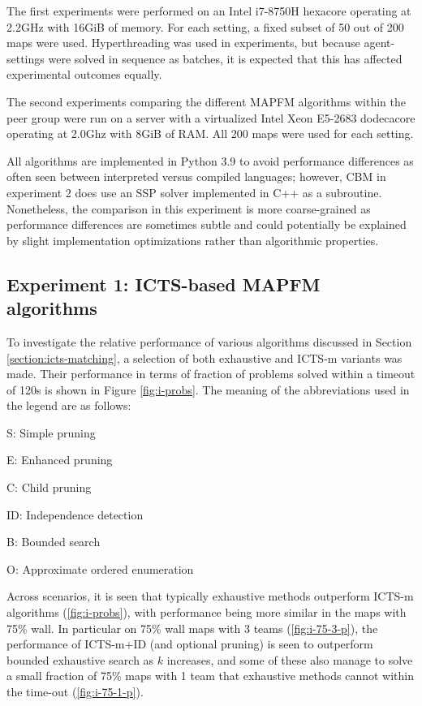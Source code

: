 \documentclass[english,10pt]{article}
\begin{document}
	The first experiments were performed on an Intel i7-8750H hexacore operating at 2.2GHz with 16GiB of memory. For each setting, a fixed subset of 50 out of 200 maps were used. Hyperthreading was used in experiments, but because agent-settings were solved in sequence as batches, it is expected that this has affected experimental outcomes equally.
	
	The second experiments comparing the different MAPFM algorithms within the peer group were run on a server with a virtualized Intel Xeon E5-2683 dodecacore operating at 2.0Ghz with 8GiB of RAM. All 200 maps were used for each setting.
	
	All algorithms are implemented in Python 3.9 to avoid performance differences as often seen between interpreted versus compiled languages; however, CBM\cite{baauw2021} in experiment 2 does use an SSP solver implemented in C++ as a subroutine. Nonetheless, the comparison in this experiment is more coarse-grained as performance differences are sometimes subtle and could potentially be explained by slight implementation optimizations rather than algorithmic properties.
	
	\subsection{Experiment 1: ICTS-based MAPFM algorithms}
	To investigate the relative performance of various algorithms discussed in Section \ref{section:icts-matching}, a selection of both exhaustive and ICTS-m variants was made. Their performance in terms of fraction of problems solved within a timeout of 120s is shown in Figure \ref{fig:i-probs}. The meaning of the abbreviations used in the legend are as follows:
	\begin{itemize}
		\begin{minipage}{0.45\linewidth}
			\item S: Simple pruning
			\item E: Enhanced pruning
			\item C: Child pruning
		\end{minipage}
		\begin{minipage}{0.45\linewidth}
			\item ID: Independence detection
			\item B: Bounded search
			\item O: Approximate ordered enumeration
		\end{minipage}
	\end{itemize}
	Across scenarios, it is seen that typically exhaustive methods outperform ICTS-m algorithms (\ref{fig:i-probs}), with performance being more similar in the maps with 75\% wall. In particular on 75\% wall maps with 3 teams (\ref{fig:i-75-3-p}), the performance of ICTS-m+ID (and optional pruning) is seen to outperform bounded exhaustive search as $k$ increases, and some of these also manage to solve a small fraction of 75\% maps with 1 team that exhaustive methods cannot within the time-out (\ref{fig:i-75-1-p}).
	
\end{document}

